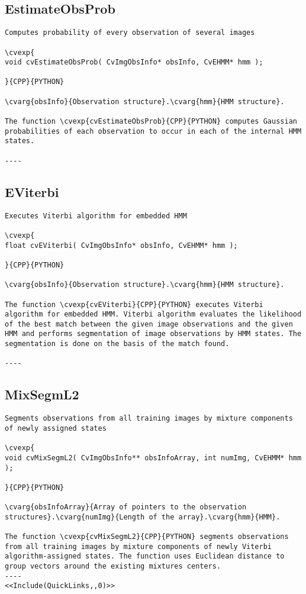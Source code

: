\subsection{EstimateObsProb}
\begin{verbatim}
Computes probability of every observation of several images

\cvexp{
void cvEstimateObsProb( CvImgObsInfo* obsInfo, CvEHMM* hmm );

}{CPP}{PYTHON}

\cvarg{obsInfo}{Observation structure}.\cvarg{hmm}{HMM structure}.

The function \cvexp{cvEstimateObsProb}{CPP}{PYTHON} computes Gaussian probabilities of each observation to occur in each of the internal HMM states.

----
\end{verbatim}
\subsection{EViterbi}
\begin{verbatim}
Executes Viterbi algorithm for embedded HMM

\cvexp{
float cvEViterbi( CvImgObsInfo* obsInfo, CvEHMM* hmm );

}{CPP}{PYTHON}

\cvarg{obsInfo}{Observation structure}.\cvarg{hmm}{HMM structure}.

The function \cvexp{cvEViterbi}{CPP}{PYTHON} executes Viterbi algorithm for embedded HMM. Viterbi algorithm evaluates the likelihood of the best match between the given image observations and the given HMM and performs segmentation of image observations by HMM states. The segmentation is done on the basis of the match found.

----
\end{verbatim}
\subsection{MixSegmL2}
\begin{verbatim}
Segments observations from all training images by mixture components of newly assigned states

\cvexp{
void cvMixSegmL2( CvImgObsInfo** obsInfoArray, int numImg, CvEHMM* hmm );

}{CPP}{PYTHON}

\cvarg{obsInfoArray}{Array of pointers to the observation structures}.\cvarg{numImg}{Length of the array}.\cvarg{hmm}{HMM}.

The function \cvexp{cvMixSegmL2}{CPP}{PYTHON} segments observations from all training images by mixture components of newly Viterbi algorithm-assigned states. The function uses Euclidean distance to group vectors around the existing mixtures centers.
----
<<Include(QuickLinks,,0)>>
\end{verbatim}
